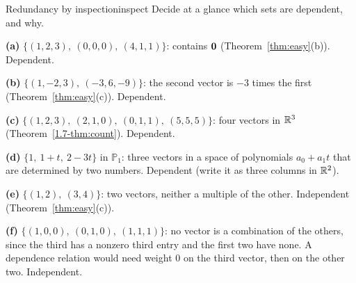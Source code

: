 \documentclass[11pt]{article}
\begin{document}
\begin{exmp}{Redundancy by inspection}{inspect}
Decide at a glance which sets are dependent, and why.

\textbf{(a)} $\{(1,2,3),\ (0,0,0),\ (4,1,1)\}$: contains $\mathbf{0}$ (Theorem~\ref{thm:easy}(b)). Dependent.

\textbf{(b)} $\{(1,-2,3),\ (-3,6,-9)\}$: the second vector is $-3$ times the first (Theorem~\ref{thm:easy}(c)). Dependent.

\textbf{(c)} $\{(1,2,3),\ (2,1,0),\ (0,1,1),\ (5,5,5)\}$: four vectors in $\mathbb{R}^3$ (Theorem~\ref{1.7-thm:count}). Dependent.

\textbf{(d)} $\{1,\ 1+t,\ 2-3t\}$ in $\mathbb{P}_1$: three vectors in a space of polynomials $a_0+a_1t$ that are determined by two numbers. Dependent (write it as three columns in $\mathbb{R}^2$).

\textbf{(e)} $\{(1,2),\ (3,4)\}$: two vectors, neither a multiple of the other. Independent (Theorem~\ref{thm:easy}(c)).

\textbf{(f)} $\{(1,0,0),\ (0,1,0),\ (1,1,1)\}$: no vector is a combination of the others, since the third has a nonzero third entry and the first two have none. A dependence relation would need weight $0$ on the third vector, then on the other two. Independent.
\end{exmp}

\begin{center}
\end{center}
\end{document}
